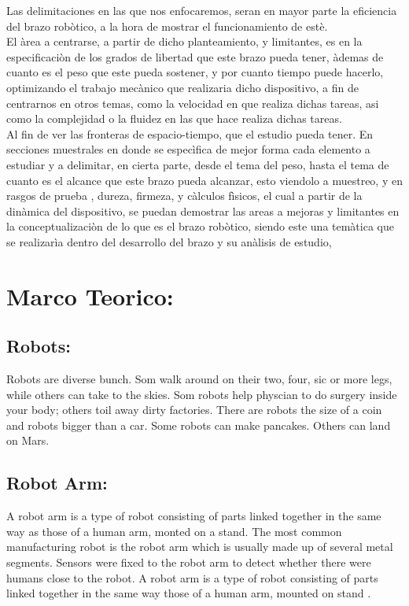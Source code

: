 \documentclass[14pt,a4paper]{article}
\begin{document}
Las delimitaciones en las que nos enfocaremos, seran en mayor parte la eficiencia del brazo robòtico, a la hora de mostrar el funcionamiento de estè.\\
El àrea a centrarse, a partir de dicho planteamiento, y limitantes, es en la especificaciòn de los grados de libertad que este brazo pueda tener, àdemas de cuanto es el peso que este pueda sostener, y por cuanto tiempo puede hacerlo, optimizando el trabajo mecànico que realizaria dicho dispositivo, a fin de centrarnos en otros temas, como la velocidad en que realiza dichas tareas, asi como la complejidad o la fluidez en las que hace realiza dichas tareas.\\
Al fin de ver las fronteras de espacio-tiempo, que el estudio pueda tener. En secciones muestrales en donde se especìfica de mejor forma cada elemento a estudiar y a delimitar, en cierta parte, desde el tema del peso, hasta el tema de cuanto es el alcance que este brazo pueda alcanzar, esto viendolo a muestreo, y en rasgos de prueba , dureza, firmeza, y càlculos fìsicos, el cual a partir de la dinàmica del dispositivo, se puedan demostrar las areas a  mejoras y limitantes en la conceptualizaciòn de lo que es el brazo robòtico, siendo este una temàtica que se realizarìa dentro del desarrollo del brazo y su anàlisis de estudio,

\section{Marco Teorico:}

\subsection{Robots:}
Robots are diverse bunch. Som walk around on their two, four, sic or more legs, while others can take to the skies. Som robots help physcian to do surgery inside your body; others toil away dirty factories. There are robots the size of a coin and robots bigger than a car. Some robots can make pancakes. Others can land on Mars.

\subsection{Robot Arm:} 
A robot arm is a type of robot consisting of parts linked together in the same way as those of a human arm, monted on a stand.
The most common manufacturing robot is the robot arm which is usually made up of several metal segments.
Sensors were fixed to the robot arm to detect whether there were humans close to the robot.
A robot arm is a type of robot consisting of parts linked together in the same way those of a human arm, mounted on stand \citep{schilling1990fundamentals} .
\end{document}
